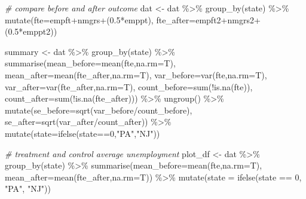 \documentclass[
]{article}
\newenvironment{Shaded}{\begin{snugshade}}{\end{snugshade}}
\newcommand{\AttributeTok}[1]{\textcolor[rgb]{0.77,0.63,0.00}{#1}}
\newcommand{\CommentTok}[1]{\textcolor[rgb]{0.56,0.35,0.01}{\textit{#1}}}
\newcommand{\DecValTok}[1]{\textcolor[rgb]{0.00,0.00,0.81}{#1}}
\newcommand{\FloatTok}[1]{\textcolor[rgb]{0.00,0.00,0.81}{#1}}
\newcommand{\FunctionTok}[1]{\textcolor[rgb]{0.00,0.00,0.00}{#1}}
\newcommand{\NormalTok}[1]{#1}
\newcommand{\OtherTok}[1]{\textcolor[rgb]{0.56,0.35,0.01}{#1}}
\newcommand{\SpecialCharTok}[1]{\textcolor[rgb]{0.00,0.00,0.00}{#1}}
\newcommand{\StringTok}[1]{\textcolor[rgb]{0.31,0.60,0.02}{#1}}
\begin{document}
\begin{Shaded}
\begin{Highlighting}[]
\CommentTok{\# compare before and after outcome}
\NormalTok{dat }\OtherTok{\textless{}{-}}\NormalTok{ dat }\SpecialCharTok{\%\textgreater{}\%} 
  \FunctionTok{group\_by}\NormalTok{(state) }\SpecialCharTok{\%\textgreater{}\%} 
  \FunctionTok{mutate}\NormalTok{(}\AttributeTok{fte=}\NormalTok{empft}\SpecialCharTok{+}\NormalTok{nmgrs}\SpecialCharTok{+}\NormalTok{(}\FloatTok{0.5}\SpecialCharTok{*}\NormalTok{emppt),}
         \AttributeTok{fte\_after=}\NormalTok{empft2}\SpecialCharTok{+}\NormalTok{nmgrs2}\SpecialCharTok{+}\NormalTok{(}\FloatTok{0.5}\SpecialCharTok{*}\NormalTok{emppt2)) }


\NormalTok{summary }\OtherTok{\textless{}{-}}\NormalTok{ dat }\SpecialCharTok{\%\textgreater{}\%} \FunctionTok{group\_by}\NormalTok{(state) }\SpecialCharTok{\%\textgreater{}\%} 
            \FunctionTok{summarise}\NormalTok{(}\AttributeTok{mean\_before=}\FunctionTok{mean}\NormalTok{(fte,}\AttributeTok{na.rm=}\NormalTok{T),}
                      \AttributeTok{mean\_after=}\FunctionTok{mean}\NormalTok{(fte\_after,}\AttributeTok{na.rm=}\NormalTok{T),}
                      \AttributeTok{var\_before=}\FunctionTok{var}\NormalTok{(fte,}\AttributeTok{na.rm=}\NormalTok{T),}
                      \AttributeTok{var\_after=}\FunctionTok{var}\NormalTok{(fte\_after,}\AttributeTok{na.rm=}\NormalTok{T),}
                      \AttributeTok{count\_before=}\FunctionTok{sum}\NormalTok{(}\SpecialCharTok{!}\FunctionTok{is.na}\NormalTok{(fte)),}
                      \AttributeTok{count\_after=}\FunctionTok{sum}\NormalTok{(}\SpecialCharTok{!}\FunctionTok{is.na}\NormalTok{(fte\_after))) }\SpecialCharTok{\%\textgreater{}\%}
           \FunctionTok{ungroup}\NormalTok{() }\SpecialCharTok{\%\textgreater{}\%}
           \FunctionTok{mutate}\NormalTok{(}\AttributeTok{se\_before=}\FunctionTok{sqrt}\NormalTok{(var\_before}\SpecialCharTok{/}\NormalTok{count\_before),}
                  \AttributeTok{se\_after=}\FunctionTok{sqrt}\NormalTok{(var\_after}\SpecialCharTok{/}\NormalTok{count\_after)) }\SpecialCharTok{\%\textgreater{}\%}
          \FunctionTok{mutate}\NormalTok{(}\AttributeTok{state=}\FunctionTok{ifelse}\NormalTok{(state}\SpecialCharTok{==}\DecValTok{0}\NormalTok{,}\StringTok{"PA"}\NormalTok{,}\StringTok{"NJ"}\NormalTok{)) }


\CommentTok{\# treatment and control average unemployment}
\NormalTok{plot\_df }\OtherTok{\textless{}{-}}\NormalTok{ dat }\SpecialCharTok{\%\textgreater{}\%}
  \FunctionTok{group\_by}\NormalTok{(state) }\SpecialCharTok{\%\textgreater{}\%} 
  \FunctionTok{summarise}\NormalTok{(}\AttributeTok{mean\_before=}\FunctionTok{mean}\NormalTok{(fte,}\AttributeTok{na.rm=}\NormalTok{T),}
            \AttributeTok{mean\_after=}\FunctionTok{mean}\NormalTok{(fte\_after,}\AttributeTok{na.rm=}\NormalTok{T)) }\SpecialCharTok{\%\textgreater{}\%}
  \FunctionTok{mutate}\NormalTok{(}\AttributeTok{state =} \FunctionTok{ifelse}\NormalTok{(state }\SpecialCharTok{==} \DecValTok{0}\NormalTok{, }\StringTok{"PA"}\NormalTok{, }\StringTok{"NJ"}\NormalTok{)) }


\end{Highlighting}
\end{Shaded}
\end{document}
